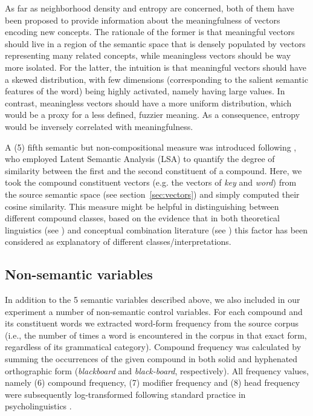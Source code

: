 As far as neighborhood density and entropy are concerned, both of them have been proposed to provide information about the meaningfulness of vectors encoding new concepts. The rationale of the former is that meaningful vectors should live in a region of the semantic space that is densely populated by vectors representing many related concepts, while meaningless vectors should be way more isolated. For the latter, the intuition is that meaningful vectors should have a skewed distribution, with few dimensions (corresponding to the salient semantic features of the word) being highly activated, namely having large values. In contrast, meaningless vectors should have a more uniform distribution, which would be a proxy for a less defined, fuzzier meaning. As a consequence, entropy would be inversely correlated with meaningfulness.

A (5) fifth semantic but non-compositional measure was introduced following \cite{lynott2001}, who employed Latent Semantic Analysis (LSA) to quantify the degree of similarity between the first and the second constituent of a compound. Here, we took the compound constituent vectors (e.g. the vectors of \emph{key} and \emph{word}) from the source semantic space (see section~\ref{sec:vectors}) and simply computed their cosine similarity. This measure might be helpful in distinguishing between different compound classes, based on the evidence that in both theoretical linguistics (see \citealt{lieber5OHC}) and conceptual combination literature (see \citealt{wisniewski1996}) this factor has been considered as explanatory of different classes/interpretations.

\subsection{Non-semantic variables}

In addition to the 5 semantic variables described above, we also included in our experiment a number of non-semantic control variables. For each compound and its constituent words we extracted word-form frequency from the source corpus (i.e., the number of times a word is encountered in the corpus in that exact form, regardless of its grammatical category). Compound frequency was calculated by summing the occurrences of the given compound in both solid and hyphenated orthographic form (\emph{blackboard} and \emph{black-board}, respectively). All frequency values, namely (6) compound frequency, (7) modifier frequency and (8) head frequency were subsequently log-transformed following standard practice in psycholinguistics \citep{brysbaert2018}.


